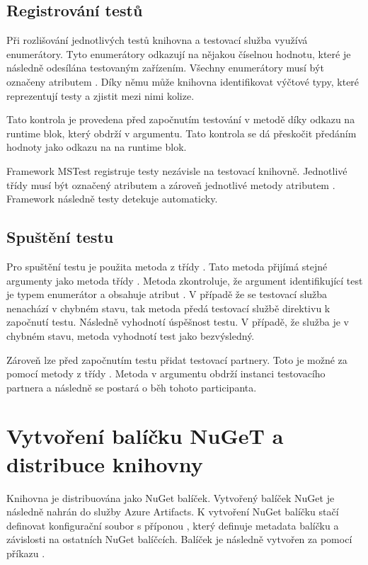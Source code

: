 \subsection{Registrování testů}

Při rozlišování jednotlivých testů knihovna a testovací služba využívá enumerátory. Tyto enumerátory odkazují na nějakou číselnou hodnotu, které je následně odesílána testovaným zařízením. Všechny enumerátory musí být označeny atributem . Díky němu může knihovna identifikovat výčtové typy, které reprezentují testy a zjistit mezi nimi kolize. 

Tato kontrola je provedena před započnutím testování v metodě  díky odkazu na runtime blok, který obdrží v argumentu. Tato kontrola se dá přeskočit předáním hodnoty  jako odkazu na na runtime blok.

Framework MSTest registruje testy nezávisle na testovací knihovně. Jednotlivé třídy musí být označený atributem  a zároveň jednotlivé metody atributem . Framework následně testy detekuje automaticky.

\subsection{Spuštění testu}
Pro spuštění testu je použita metoda  z třídy . Tato metoda přijímá stejné argumenty jako metoda  třídy . Metoda zkontroluje, že argument identifikující test je typem enumerátor a obsahuje atribut . V případě že se testovací služba nenachází v chybném stavu, tak metoda předá testovací službě direktivu k započnutí testu. Následně vyhodnotí úspěšnost testu. V případě, že služba je v chybném stavu, metoda vyhodnotí test jako bezvýsledný.

Zároveň lze před započnutím testu přidat testovací partnery. Toto je možné za pomocí metody  z třídy . Metoda v argumentu obdrží instanci testovacího partnera a následně se postará o běh tohoto participanta.


\section{Vytvoření balíčku NuGeT a distribuce knihovny}\label{sec:distrbution}

Knihovna je distribuována jako NuGet balíček. Vytvořený balíček NuGet je následně nahrán do služby Azure Artifacts. K vytvoření NuGet balíčku stačí definovat konfigurační soubor s příponou , který definuje metadata balíčku a závislosti na ostatních NuGet balíčcích. Balíček je následně vytvořen za pomocí příkazu . 

